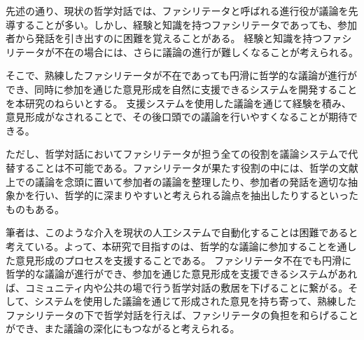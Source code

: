 \documentclass[11pt, a4paper]{jreport} %
\begin{document}


先述の通り、現状の哲学対話では、ファシリテータと呼ばれる進行役が議論を先導することが多い。しかし、経験と知識を持つファシリテータであっても、参加者から発話を引き出すのに困難を覚えることがある\cite{umaku}。
経験と知識を持つファシリテータが不在の場合には、さらに議論の進行が難しくなることが考えられる。


そこで、熟練したファシリテータが不在であっても円滑に哲学的な議論が進行ができ、同時に参加を通じた意見形成を自然に支援できるシステムを開発することを本研究のねらいとする。
支援システムを使用した議論を通じて経験を積み、意見形成がなされることで、その後口頭での議論を行いやすくなることが期待できる。


ただし、哲学対話においてファシリテータが担う全ての役割を議論システムで代替することは不可能である。ファシリテータが果たす役割の中には、哲学の文献上での議論を念頭に置いて参加者の議論を整理したり、参加者の発話を適切な抽象かを行い、哲学的に深まりやすいと考えられる論点を抽出したりするといったものもある。

筆者は、このような介入を現状の人工システムで自動化することは困難であると考えている。よって、本研究で目指すのは、哲学的な議論に参加することを通した意見形成のプロセスを支援することである。
ファシリテータ不在でも円滑に哲学的な議論が進行ができ、参加を通じた意見形成を支援できるシステムがあれば、コミュニティ内や公共の場で行う哲学対話の敷居を下げることに繋がる。そして、システムを使用した議論を通じて形成された意見を持ち寄って、熟練したファシリテータの下で哲学対話を行えば、ファシリテータの負担を和らげることができ、また議論の深化にもつながると考えられる。





\end{document}

